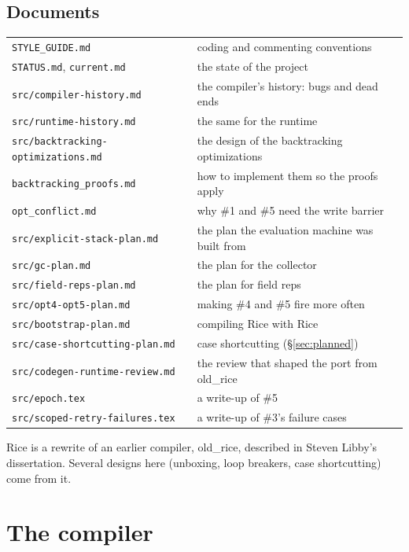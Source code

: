 \documentclass[11pt]{article}
\newcommand{\file}[1]{\nolinkurl{#1}}
\begin{document}
\subsection{Documents}
\label{sec:docs}

\begin{longtable}{@{}p{}p{}@{}}
\toprule
\file{STYLE_GUIDE.md} & coding and commenting conventions \\
\file{STATUS.md}, \file{current.md} & the state of the project \\
\file{src/compiler-history.md} & the compiler's history: bugs and dead ends \\
\file{src/runtime-history.md} & the same for the runtime \\
\file{src/backtracking-optimizations.md} & the design of the backtracking
  optimizations \\
\file{backtracking_proofs.md} & how to implement them so the proofs apply \\
\file{opt_conflict.md} & why \#1 and \#5 need the write barrier \\
\file{src/explicit-stack-plan.md} & the plan the evaluation machine was built
  from \\
\file{src/gc-plan.md} & the plan for the collector \\
\file{src/field-reps-plan.md} & the plan for field reps \\
\file{src/opt4-opt5-plan.md} & making \#4 and \#5 fire more often \\
\file{src/bootstrap-plan.md} & compiling Rice with Rice \\
\file{src/case-shortcutting-plan.md} & case shortcutting (\S\ref{sec:planned}) \\
\file{src/codegen-runtime-review.md} & the review that shaped the port from
  old\_rice \\
\file{src/epoch.tex} & a write-up of \#5 \\
\file{src/scoped-retry-failures.tex} & a write-up of \#3's failure cases \\
\bottomrule
\end{longtable}

Rice is a rewrite of an earlier compiler, old\_rice, described in Steven
Libby's dissertation.  Several designs here (unboxing, loop breakers, case
shortcutting) come from it.

\section{The compiler}
\label{sec:compiler}
\end{document}

